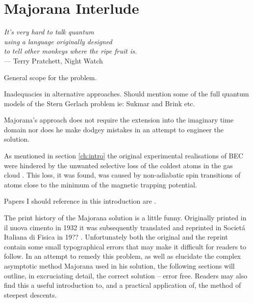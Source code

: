 
\chapter{Majorana Interlude} %

\label{ch:majinter} %


\begin{flushright}{\slshape    
It's very hard to talk quantum\\
using a language originally designed\\
to tell other monkeys where the ripe fruit is.} \\ \medskip
--- Terry Pratchett, Night Watch
\end{flushright}

\bigskip


General scope for the problem.

Inadequacies in alternative approaches. Should mention some of the full quantum models of the Stern Gerlach problem ie: Sukmar and Brink etc.

Majorana's approach does not require the extension into the imaginary time domain nor does he make dodgey mistakes in an attempt to engineer the solution.

As mentioned in section \autoref{ch:intro} the original experimental realisations of BEC were hindered by the unwanted selective loss of the coldest atoms in the gas cloud \cite{Cornell2002, Ketterle2002}.
This loss, it was found, was caused by non-adiabatic spin transitions of atoms close to the minimum of the magnetic trapping potential.

Papers I should reference in this introduction are \cite{Bloch1945,Giacomo2005,Wittig2005,Ma2006, Vutha2010}.

The print history of the Majorana solution is a little funny.
Originally printed in il nuova cimento in 1932 \cite{?} it was subsequently translated and reprinted in Societ\'a Italiana di Fisica in 19?? \cite{?}.
Unfortunately both the original and the reprint contain some small typographical errors that may make it difficult for readers to follow.
In an attempt to remedy this problem, as well as elucidate the complex asymptotic method Majorana used in his solution, the following sections will outline, in excruciating detail, the correct solution -- error free.
Readers may also find this a useful introduction to, and a practical application of, the method of steepest descents.


